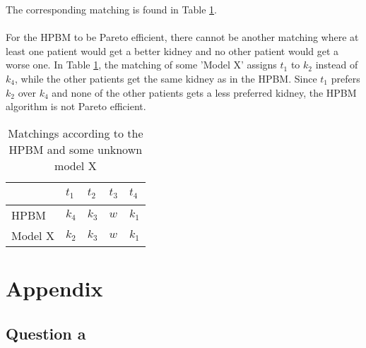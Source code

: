\documentclass{article}
\begin{document}
\noindent The corresponding matching is found in Table \ref{table_pe}.
\\ \\
For the HPBM to be Pareto efficient, there cannot be another matching where at least one patient would get a better kidney and no other patient would get a worse one. In Table \ref{table_pe}, the matching of some 'Model X' assigns $t_1$ to $k_2$ instead of $k_4$, while the other patients get the same kidney as in the HPBM. Since $t_1$ prefers $k_2$ over $k_4$ and none of the other patients gets a less preferred kidney, the HPBM algorithm is not Pareto efficient.

\begin{table}[H]
\centering
    \begin{tabular}{lllll}
        \toprule
        ~       & $t_1$ & $t_2$ & $t_3$ & $t_4$\\
        \midrule
        HPBM    & $k_4$ & $k_3$ & $w$   & $k_1$ \\ 
        Model X & $k_2$ & $k_3$ & $w$   & $k_1$ \\ 
        \bottomrule
    \end{tabular}
\caption{Matchings according to the HPBM and some unknown model X}
\label{table_pe}
\end{table}

\appendix
\section{Appendix}
\subsection{Question a}
\end{document}
